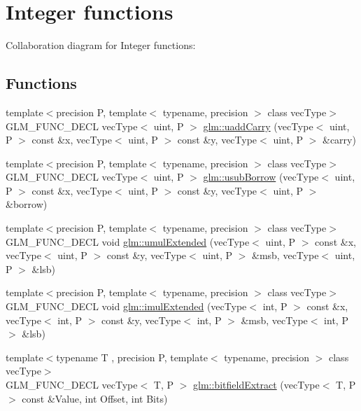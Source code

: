 \hypertarget{group__core__func__integer}{\section{Integer functions}
\label{group__core__func__integer}
}
Collaboration diagram for Integer functions\-:
\subsection*{Functions}
\begin{DoxyCompactItemize}
\item 
{\footnotesize template$<$precision P, template$<$ typename, precision $>$ class vec\-Type$>$ }\\G\-L\-M\-\_\-\-F\-U\-N\-C\-\_\-\-D\-E\-C\-L vec\-Type$<$ uint, P $>$ \hyperlink{group__core__func__integer_ga2fc1a46e7b7e9fbbd8fa444fbacaa2aa}{glm\-::uadd\-Carry} (vec\-Type$<$ uint, P $>$ const \&x, vec\-Type$<$ uint, P $>$ const \&y, vec\-Type$<$ uint, P $>$ \&carry)
\item 
{\footnotesize template$<$precision P, template$<$ typename, precision $>$ class vec\-Type$>$ }\\G\-L\-M\-\_\-\-F\-U\-N\-C\-\_\-\-D\-E\-C\-L vec\-Type$<$ uint, P $>$ \hyperlink{group__core__func__integer_ga22a889bf08313b7e547e2cdb8bb15ee4}{glm\-::usub\-Borrow} (vec\-Type$<$ uint, P $>$ const \&x, vec\-Type$<$ uint, P $>$ const \&y, vec\-Type$<$ uint, P $>$ \&borrow)
\item 
{\footnotesize template$<$precision P, template$<$ typename, precision $>$ class vec\-Type$>$ }\\G\-L\-M\-\_\-\-F\-U\-N\-C\-\_\-\-D\-E\-C\-L void \hyperlink{group__core__func__integer_ga456ff9dcec42f6769a9ae2a2af7f1ce1}{glm\-::umul\-Extended} (vec\-Type$<$ uint, P $>$ const \&x, vec\-Type$<$ uint, P $>$ const \&y, vec\-Type$<$ uint, P $>$ \&msb, vec\-Type$<$ uint, P $>$ \&lsb)
\item 
{\footnotesize template$<$precision P, template$<$ typename, precision $>$ class vec\-Type$>$ }\\G\-L\-M\-\_\-\-F\-U\-N\-C\-\_\-\-D\-E\-C\-L void \hyperlink{group__core__func__integer_ga6e6e8b29ca40d8ca2df10b58ed17d426}{glm\-::imul\-Extended} (vec\-Type$<$ int, P $>$ const \&x, vec\-Type$<$ int, P $>$ const \&y, vec\-Type$<$ int, P $>$ \&msb, vec\-Type$<$ int, P $>$ \&lsb)
\item 
{\footnotesize template$<$typename T , precision P, template$<$ typename, precision $>$ class vec\-Type$>$ }\\G\-L\-M\-\_\-\-F\-U\-N\-C\-\_\-\-D\-E\-C\-L vec\-Type$<$ T, P $>$ \hyperlink{group__core__func__integer_gab84b88f3a8e367774e5dd1c618c353cf}{glm\-::bitfield\-Extract} (vec\-Type$<$ T, P $>$ const \&Value, int Offset, int Bits)

\end{DoxyCompactItemize}
